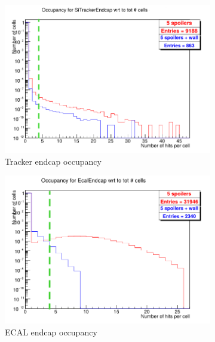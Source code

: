 \begin{figure}
    \centering
    \begin{subfigure}[b]{0.49\textwidth}
    \centering
        \includegraphics[height=0.265\textheight]{figures/SiTrackerEndcap_Occupancy.png}
        \caption{Tracker endcap occupancy}
	\label{fig:SiTracker_Occupancy}
    \end{subfigure}
    \begin{subfigure}[b]{0.49\textwidth}
    \centering
        \includegraphics[height=0.265\textheight]{figures/EcalEndcap_Occupancy.png}
        \caption{ECAL endcap occupancy}
        \label{fig:Ecal_Occupancy}
    \end{subfigure}\\
    \begin{subfigure}[b]{0.49\textwidth}

\end{subfigure}
\end{figure}
